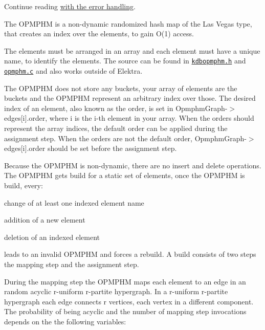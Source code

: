 Continue reading \hyperlink{doc_dev_error-handling_md}{with the error handling}.

The O\+P\+M\+P\+HM is a non-\/dynamic randomized hash map of the Las Vegas type, that creates an index over the elements, to gain O(1) access.

The elements must be arranged in an array and each element must have a unique name, to identify the elements. The source can be found in \href{/home/jenkins/workspace/libelektra-release/src/include/kdbopmphm.h}{\tt kdbopmphm.\+h} and \href{/home/jenkins/workspace/libelektra-release/src/libs/elektra/opmphm.c}{\tt opmphm.\+c} and also works outside of Elektra.

The O\+P\+M\+P\+HM does not store any buckets, your array of elements are the buckets and the O\+P\+M\+P\+HM represent an arbitrary index over those. The desired index of an element, also known as the order, is set in {\ttfamily Opmphm\+Graph-\/$>$edges\mbox{[}i\mbox{]}.order}, where {\ttfamily i} is the i-\/th element in your array. When the orders should represent the array indices, the default order can be applied during the assignment step. When the orders are not the default order, {\ttfamily Opmphm\+Graph-\/$>$edges\mbox{[}i\mbox{]}.order} should be set before the assignment step.

Because the O\+P\+M\+P\+HM is non-\/dynamic, there are no insert and delete operations. The O\+P\+M\+P\+HM gets build for a static set of elements, once the O\+P\+M\+P\+HM is build, every\+:


\begin{DoxyItemize}
\item change of at least one indexed element name
\item addition of a new element
\item deletion of an indexed element
\end{DoxyItemize}

leads to an invalid O\+P\+M\+P\+HM and forces a rebuild. A build consists of two steps the mapping step and the assignment step.

During the mapping step the O\+P\+M\+P\+HM maps each element to an edge in an random acyclic r-\/uniform r-\/partite hypergraph. In a r-\/uniform r-\/partite hypergraph each edge connects {\ttfamily r} vertices, each vertex in a different component. The probability of being acyclic and the number of mapping step invocations depends on the the following variables\+:



